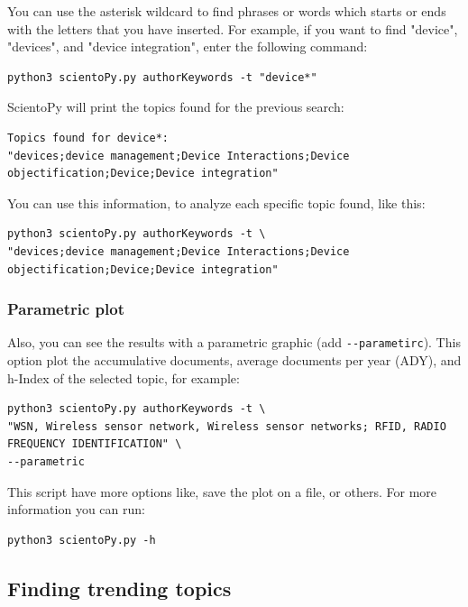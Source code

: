 \documentclass[10pt,letterpaper]{article}
\begin{document}
You can use the asterisk wildcard to find phrases or words which starts or ends with the letters that you have inserted. For example, if you want to find "device", "devices", and "device integration", enter the following command: 

\begin{verbatim}
python3 scientoPy.py authorKeywords -t "device*"
\end{verbatim}

ScientoPy will print the topics found for the previous search: 

\begin{verbatim}
Topics found for device*:
"devices;device management;Device Interactions;Device objectification;Device;Device integration"
\end{verbatim}

You can use this information, to analyze each specific topic found, like this: 

\begin{verbatim}
python3 scientoPy.py authorKeywords -t \
"devices;device management;Device Interactions;Device objectification;Device;Device integration"
\end{verbatim}


\subsubsection{Parametric plot}

Also, you can see the results with a parametric graphic (add \verb|--parametirc|). This option plot the accumulative documents, average documents per year (ADY), and h-Index of the selected topic, for example:

\begin{verbatim}
python3 scientoPy.py authorKeywords -t \
"WSN, Wireless sensor network, Wireless sensor networks; RFID, RADIO FREQUENCY IDENTIFICATION" \
--parametric
\end{verbatim}

This script have more options like, save the plot on a file, or others. For more information you can run:

\begin{verbatim}
python3 scientoPy.py -h
\end{verbatim}

\subsection{Finding trending topics}
\end{document}
